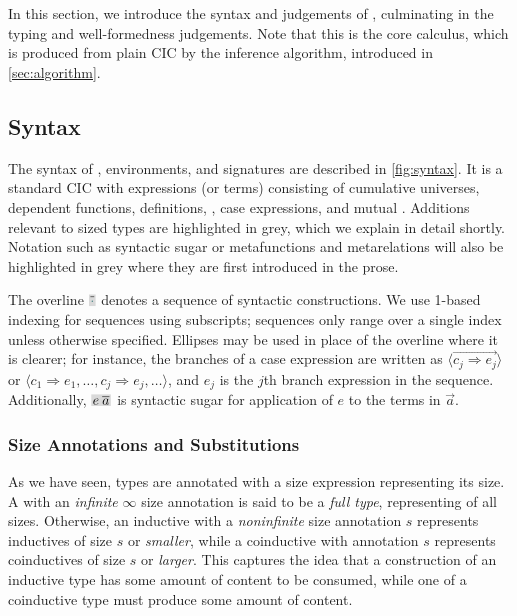 \section{\titlelang}\label{sec:typing}
In this section, we introduce the syntax and judgements of \lang,
culminating in the typing and well-formedness judgements.
Note that this is the core calculus, which is produced from plain CIC by the inference algorithm,
introduced in \autoref{sec:algorithm}.

\subsection{Syntax}

\label{sec:typing:syntax}

The syntax of \lang, environments, and signatures are described in \autoref{fig:syntax}.
It is a standard CIC with expressions (or terms) consisting of cumulative universes, dependent functions, definitions, \coinductives, case expressions, and mutual \cofixpoints.
Additions relevant to sized types are highlighted in grey,
which we explain in detail shortly.
Notation such as syntactic sugar or metafunctions and metarelations will also be highlighted in grey
where they are first introduced in the prose.

The overline $\new{\vec{\ph}}$ denotes a sequence of syntactic constructions.
We use 1-based indexing for sequences using subscripts;
sequences only range over a single index unless otherwise specified.
Ellipses may be used in place of the overline where it is clearer;
for instance, the branches of a case expression are written as
$\langle \vec{c_j \Rightarrow e_j} \rangle$ or
$\langle c_1 \Rightarrow e_1, \dots, c_j \Rightarrow e_j, \dots \rangle$,
and $e_j$ is the $j$th branch expression in the sequence.
Additionally, $\new{\app{e}{\vec{a}}}$ is syntactic sugar for application of $e$ to the terms in $\vec{a}$.

\subsubsection{Size Annotations and Substitutions}

As we have seen, \coinductive types are annotated with a size expression representing its size.
A \coinductive with an \textit{infinite} $\infty$ size annotation is said to be a \textit{full type},
representing \coinductives of all sizes.
Otherwise, an inductive with a \textit{noninfinite} size annotation $s$ represents inductives of size $s$ or \emph{smaller},
while a coinductive with annotation $s$ represents coinductives of size $s$ or \emph{larger}.
This captures the idea that a construction of an inductive type has some amount of content to be consumed,
while one of a coinductive type must produce some amount of content.

